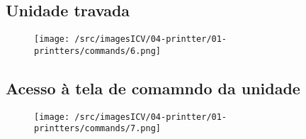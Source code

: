 \subsection{Unidade travada}
\begin{figure}
    \centering
    \texttt{[image: /src/imagesICV/04-printter/01-printters/commands/6.png]}
\end{figure}
\newpage
\thispagestyle{fancy}
\vspace{\fill}

\subsection{Acesso à tela de comamndo da unidade}
\begin{figure}
    \centering
    \texttt{[image: /src/imagesICV/04-printter/01-printters/commands/7.png]}
\end{figure}


